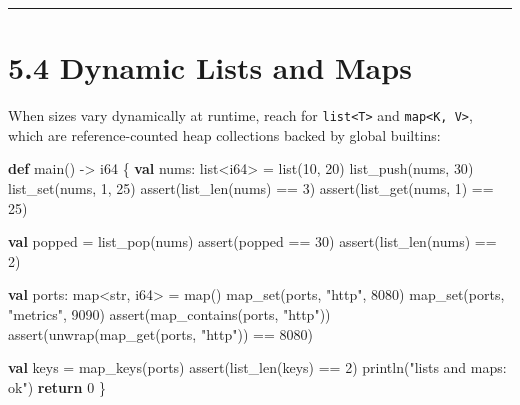 \documentclass[
  english,
  oneside]{book}
\newenvironment{Shaded}{\begin{snugshade}}{\end{snugshade}}
\newcommand{\ControlFlowTok}[1]{\textcolor[rgb]{0.77,0.53,0.75}{\textbf{#1}}}
\newcommand{\DataTypeTok}[1]{\textcolor[rgb]{0.31,0.79,0.69}{#1}}
\newcommand{\DecValTok}[1]{\textcolor[rgb]{0.71,0.81,0.66}{#1}}
\newcommand{\FunctionTok}[1]{\textcolor[rgb]{0.86,0.86,0.67}{#1}}
\newcommand{\KeywordTok}[1]{\textcolor[rgb]{0.34,0.61,0.84}{\textbf{#1}}}
\newcommand{\NormalTok}[1]{\textcolor[rgb]{0.83,0.83,0.83}{#1}}
\newcommand{\OperatorTok}[1]{\textcolor[rgb]{0.83,0.83,0.83}{#1}}
\newcommand{\StringTok}[1]{\textcolor[rgb]{0.81,0.57,0.47}{#1}}
\begin{document}
\begin{center}\rule{0.5\linewidth}{0.5pt}\end{center}

\section{5.4 Dynamic Lists and Maps}\label{dynamic-lists-and-maps}

When sizes vary dynamically at runtime, reach for
\texttt{list\textless{}T\textgreater{}} and
\texttt{map\textless{}K,\ V\textgreater{}}, which are reference-counted
heap collections backed by global builtins:

\begin{Shaded}
\begin{Highlighting}[]
\KeywordTok{def}\NormalTok{ main() }\OperatorTok{{-}\textgreater{}} \DataTypeTok{i64}\NormalTok{ \{}
    \KeywordTok{val}\NormalTok{ nums: }\DataTypeTok{list}\OperatorTok{\textless{}}\DataTypeTok{i64}\OperatorTok{\textgreater{}} \OperatorTok{=} \DataTypeTok{list}\NormalTok{(}\DecValTok{10}\NormalTok{, }\DecValTok{20}\NormalTok{)}
\NormalTok{    list\_push(nums, }\DecValTok{30}\NormalTok{)}
    \FunctionTok{list\_set}\NormalTok{(nums, }\DecValTok{1}\NormalTok{, }\DecValTok{25}\NormalTok{)}
    \FunctionTok{assert}\NormalTok{(}\FunctionTok{list\_len}\NormalTok{(nums) }\OperatorTok{==} \DecValTok{3}\NormalTok{)}
    \FunctionTok{assert}\NormalTok{(}\FunctionTok{list\_get}\NormalTok{(nums, }\DecValTok{1}\NormalTok{) }\OperatorTok{==} \DecValTok{25}\NormalTok{)}

    \KeywordTok{val}\NormalTok{ popped }\OperatorTok{=} \FunctionTok{list\_pop}\NormalTok{(nums)}
    \FunctionTok{assert}\NormalTok{(popped }\OperatorTok{==} \DecValTok{30}\NormalTok{)}
    \FunctionTok{assert}\NormalTok{(}\FunctionTok{list\_len}\NormalTok{(nums) }\OperatorTok{==} \DecValTok{2}\NormalTok{)}

    \KeywordTok{val}\NormalTok{ ports: }\DataTypeTok{map}\OperatorTok{\textless{}}\DataTypeTok{str}\NormalTok{, }\DataTypeTok{i64}\OperatorTok{\textgreater{}} \OperatorTok{=} \DataTypeTok{map}\NormalTok{()}
    \FunctionTok{map\_set}\NormalTok{(ports, }\StringTok{"http"}\NormalTok{, }\DecValTok{8080}\NormalTok{)}
    \FunctionTok{map\_set}\NormalTok{(ports, }\StringTok{"metrics"}\NormalTok{, }\DecValTok{9090}\NormalTok{)}
    \FunctionTok{assert}\NormalTok{(}\FunctionTok{map\_contains}\NormalTok{(ports, }\StringTok{"http"}\NormalTok{))}
    \FunctionTok{assert}\NormalTok{(unwrap(}\FunctionTok{map\_get}\NormalTok{(ports, }\StringTok{"http"}\NormalTok{)) }\OperatorTok{==} \DecValTok{8080}\NormalTok{)}

    \KeywordTok{val}\NormalTok{ keys }\OperatorTok{=} \FunctionTok{map\_keys}\NormalTok{(ports)}
    \FunctionTok{assert}\NormalTok{(}\FunctionTok{list\_len}\NormalTok{(keys) }\OperatorTok{==} \DecValTok{2}\NormalTok{)}
\NormalTok{    println(}\StringTok{"lists and maps: ok"}\NormalTok{)}
    \ControlFlowTok{return} \DecValTok{0}
\NormalTok{\}}
\end{Highlighting}
\end{Shaded}
\end{document}
